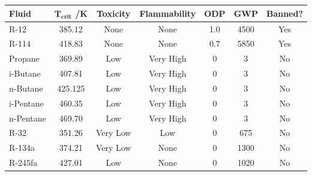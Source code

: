 \begin{tabular}{|p{3.5cm}|c c c c c c|}
    \hline
    \rowcolor{bluepoli!40} %
    \textbf{Fluid} & \(\mathbf{T_{crit}}\) /\unit{\K} & \textbf{Toxicity} & \textbf{Flammability} & \textbf{ODP} & \textbf{GWP} & \textbf{Banned?} \T\B \\
    \hline \hline
    R-12 & 385.12 & None & None & 1.0 & 4500 & Yes \T\B\\
    R-114 & 418.83 & None & None & 0.7 & 5850 & Yes \T\B\\
    Propane  & 369.89 & Low & Very High & 0 & 3 & No\T\B\\
    i-Butane & 407.81 & Low & Very High & 0 & 3 & No\T\B\\
    n-Butane & 425.125 & Low & Very High & 0 & 3 & No\T\B\\
    i-Pentane & 460.35 & Low & Very High & 0 & 3 & No\T\B\\
    n-Pentane & 469.70 & Low & Very High & 0 & 3 & No\T\B\\
    R-32 & 351.26 & Very Low & Low & 0 & 675 & No\T\B\\
    R-134a & 374.21 & Very Low & None & 0 & 1300 & No\T\B\\
    R-245fa & 427.01 & Low & None & 0 & 1020 & No\T\B\\

\end{tabular}
